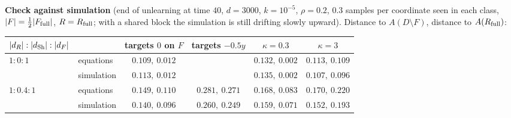 \documentclass[10pt]{article}
\newcommand{\Rf}{R_{\rm full}}\newcommand{\Ff}{F_{\rm full}}\newcommand{\dSh}{d_{\rm Sh}}
\begin{document}
\textbf{Check against simulation} (end of unlearning at time $40$, $d=3000$, $k=10^{-5}$, $\rho=0.2$, $0.3$ samples per coordinate seen in each class, $|F|=\frac12|\Ff|$, $R=\Rf$; with a shared block the simulation is still drifting slowly upward). Distance to $A(D\setminus F)$, distance to $A(\Rf)$:
\begin{center}\small\begin{tabular}{@{}llcccc@{}}\toprule
$|d_R|:|\dSh|:|d_F|$ & & targets $0$ on $F$ & targets $-0.5y$ & $\kappa=0.3$ & $\kappa=3$\\\midrule
$1:0:1$ & equations & $0.109,\ 0.012$ & & $0.132,\ 0.002$ & $0.113,\ 0.109$\\
& simulation & $0.113,\ 0.012$ & & $0.135,\ 0.002$ & $0.107,\ 0.096$\\
$1:0.4:1$ & equations & $0.149,\ 0.110$ & $0.281,\ 0.271$ & $0.168,\ 0.083$ & $0.170,\ 0.220$\\
& simulation & $0.140,\ 0.096$ & $0.260,\ 0.249$ & $0.159,\ 0.071$ & $0.152,\ 0.193$\\\bottomrule
\end{tabular}\end{center}
\end{document}
